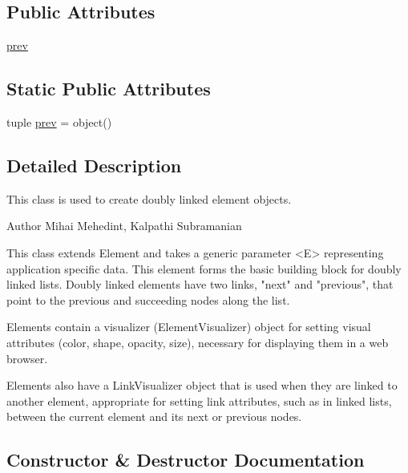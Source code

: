 \subsection*{Public Attributes}
\begin{DoxyCompactItemize}
\item 
\hyperlink{class_bridges_1_1dl__element_1_1_d_lelement_a5098c0244f6c4512db45f494266baf8a}{prev}
\end{DoxyCompactItemize}
\subsection*{Static Public Attributes}
\begin{DoxyCompactItemize}
\item 
tuple \hyperlink{class_bridges_1_1dl__element_1_1_d_lelement_a9f9abfb18c94eeac8d81a1ef6be5a398}{prev} = object()
\end{DoxyCompactItemize}


\subsection{Detailed Description}
This class is used to create doubly linked element objects. 

\begin{DoxyAuthor}{Author}
Mihai Mehedint, Kalpathi Subramanian
\end{DoxyAuthor}
\begin{DoxyVerb}This class extends Element and takes a generic parameter <E> representing
application specific data. This element forms the basic building block for
doubly linked lists. Doubly linked elements have two links,
"next" and "previous", that point to the previous and succeeding nodes along the list.

Elements contain a visualizer (ElementVisualizer) object for setting visual
attributes (color, shape, opacity, size), necessary for displaying them in a web
browser.

Elements also have a LinkVisualizer object that is used when they are linked to
another element, appropriate for setting link attributes, such as in linked lists,
between the current element and its next or previous nodes.\end{DoxyVerb}
 

\subsection{Constructor \& Destructor Documentation}
\hypertarget{class_bridges_1_1dl__element_1_1_d_lelement_aeff7357e381b47df4ca8393b0ab58fd0}{}
